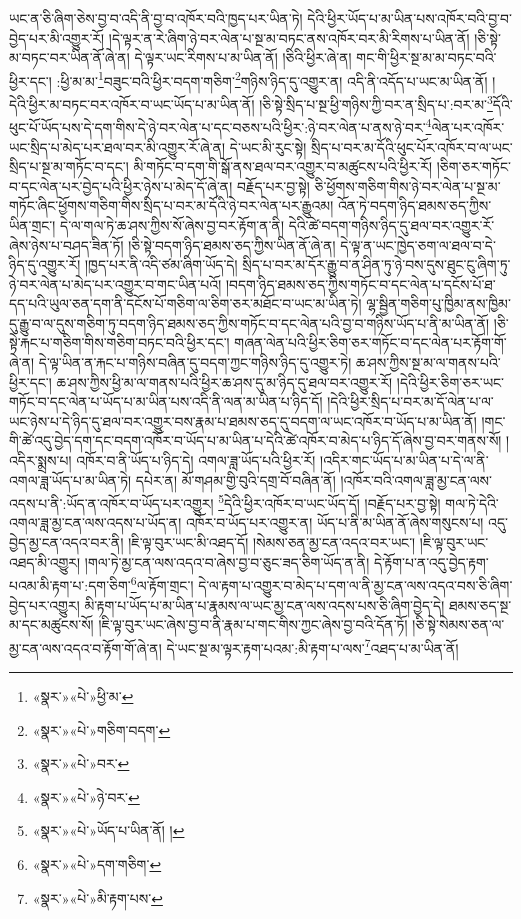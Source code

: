ཡང་ན་ཅི་ཞིག་ཅེས་བྱ་བ་འདི་ནི་བྱ་བ་འཁོར་བའི་ཁྱད་པར་ཡིན་ཏེ། དེའི་ཕྱིར་ཡོད་པ་མ་ཡིན་པས་འཁོར་བའི་བྱ་བ་བྱེད་པར་མི་འགྱུར་རོ། །དེ་ལྟར་ན་རེ་ཞིག་ཉེ་བར་ལེན་པ་སྔ་མ་བཏང་ནས་འཁོར་བར་མི་རིགས་པ་ཡིན་ནོ། །ཅི་སྟེ་མ་བཏང་བར་ཡིན་ནོ་ཞེ་ན། དེ་ལྟར་ཡང་རིགས་པ་མ་ཡིན་ནོ། །ཅིའི་ཕྱིར་ཞེ་ན། གང་གི་ཕྱིར་སྔ་མ་མ་བཏང་བའི་ཕྱིར་དང་། :ཕྱི་མ་མ་\footnote{«སྣར་»«པེ་»ཕྱི་མ་}བཟུང་བའི་ཕྱིར་བདག་གཅིག་\footnote{«སྣར་»«པེ་»གཅིག་བདག་}གཉིས་ཉིད་དུ་འགྱུར་ན། འདི་ནི་འདོད་པ་ཡང་མ་ཡིན་ནོ། །དེའི་ཕྱིར་མ་བཏང་བར་འཁོར་བ་ཡང་ཡོད་པ་མ་ཡིན་ནོ། །ཅི་སྟེ་སྲིད་པ་སྔ་ཕྱི་གཉིས་ཀྱི་བར་ན་སྲིད་པ་:བར་མ་\footnote{«སྣར་»«པེ་»བར་}དོའི་ཕུང་པོ་ཡོད་པས་དེ་དག་གིས་དེ་ཉེ་བར་ལེན་པ་དང་བཅས་པའི་ཕྱིར་:ཉེ་བར་ལེན་པ་ནས་ཉེ་བར་\footnote{«སྣར་»«པེ་»ཉེ་བར་}ལེན་པར་འཁོར་ཡང་སྲིད་པ་མེད་པར་ཐལ་བར་མི་འགྱུར་རོ་ཞེ་ན། དེ་ཡང་མི་རུང་སྟེ། སྲིད་པ་བར་མ་དོའི་ཕུང་པོར་འཁོར་བ་ལ་ཡང་སྲིད་པ་སྔ་མ་གཏོང་བ་དང་། མི་གཏོང་བ་དག་གི་སྒོ་ནས་ཐལ་བར་འགྱུར་བ་མཚུངས་པའི་ཕྱིར་རོ། །ཅིག་ཅར་གཏོང་བ་དང་ལེན་པར་བྱེད་པའི་ཕྱིར་ཉེས་པ་མེད་དོ་ཞེ་ན། བརྗོད་པར་བྱ་སྟེ། ཅི་ཕྱོགས་གཅིག་གིས་ཉེ་བར་ལེན་པ་སྔ་མ་གཏོང་ཞིང་ཕྱོགས་གཅིག་གིས་སྲིད་པ་བར་མ་དོའི་ཉེ་བར་ལེན་པར་རྒྱུའམ། འོན་ཏེ་བདག་ཉིད་ཐམས་ཅད་ཀྱིས་ཡིན་གྲང་། དེ་ལ་གལ་ཏེ་ཆ་ཤས་ཀྱིས་སོ་ཞེས་བྱ་བར་རྟོག་ན་ནི། དེའི་ཚེ་བདག་གཉིས་ཉིད་དུ་ཐལ་བར་འགྱུར་རོ་ཞེས་ཉེས་པ་བཤད་ཟིན་ཏོ། །ཅི་སྟེ་བདག་ཉིད་ཐམས་ཅད་ཀྱིས་ཡིན་ནོ་ཞེ་ན། དེ་ལྟ་ན་ཡང་ཁྱེད་ཅག་ལ་ཐལ་བ་དེ་ཉིད་དུ་འགྱུར་རོ། །ཁྱད་པར་ནི་འདི་ཙམ་ཞིག་ཡོད་དེ། སྲིད་པ་བར་མ་དོར་རྒྱུ་བ་ན་ཤིན་ཏུ་ཉེ་བས་དུས་ཐུང་ངུ་ཞིག་ཏུ་ཉེ་བར་ལེན་པ་མེད་པར་འགྱུར་བ་གང་ཡིན་པའོ། །བདག་ཉིད་ཐམས་ཅད་ཀྱིས་གཏོང་བ་དང་ལེན་པ་དངོས་པོ་ཐ་དད་པའི་ཡུལ་ཅན་དག་ནི་དངོས་པོ་གཅིག་ལ་ཅིག་ཅར་མཐོང་བ་ཡང་མ་ཡིན་ཏེ། ལྷ་སྦྱིན་གཅིག་པུ་ཁྱིམ་ནས་ཁྱིམ་དུ་རྒྱུ་བ་ལ་དུས་གཅིག་ཏུ་བདག་ཉིད་ཐམས་ཅད་ཀྱིས་གཏོང་བ་དང་ལེན་པའི་བྱ་བ་གཉིས་ཡོད་པ་ནི་མ་ཡིན་ནོ། །ཅི་སྟེ་རྐང་པ་གཅིག་གིས་གཅིག་བཏང་བའི་ཕྱིར་དང་། གཞན་ལེན་པའི་ཕྱིར་ཅིག་ཅར་གཏོང་བ་དང་ལེན་པར་རྟོག་གོ་ཞེ་ན། དེ་ལྟ་ཡིན་ན་རྐང་པ་གཉིས་བཞིན་དུ་བདག་ཀྱང་གཉིས་ཉིད་དུ་འགྱུར་ཏེ། ཆ་ཤས་ཀྱིས་སྔ་མ་ལ་གནས་པའི་ཕྱིར་དང་། ཆ་ཤས་ཀྱིས་ཕྱི་མ་ལ་གནས་པའི་ཕྱིར་ཆ་ཤས་དུ་མ་ཉིད་དུ་ཐལ་བར་འགྱུར་རོ། །དེའི་ཕྱིར་ཅིག་ཅར་ཡང་གཏོང་བ་དང་ལེན་པ་ཡོད་པ་མ་ཡིན་པས་འདི་ནི་ལན་མ་ཡིན་པ་ཉིད་དོ། །དེའི་ཕྱིར་སྲིད་པ་བར་མ་དོ་ལེན་པ་ལ་ཡང་ཉེས་པ་དེ་ཉིད་དུ་ཐལ་བར་འགྱུར་བས་རྣམ་པ་ཐམས་ཅད་དུ་བདག་ལ་ཡང་འཁོར་བ་ཡོད་པ་མ་ཡིན་ནོ། །གང་གི་ཚེ་འདུ་བྱེད་དག་དང་བདག་འཁོར་བ་ཡོད་པ་མ་ཡིན་པ་དེའི་ཚེ་འཁོར་བ་མེད་པ་ཉིད་དོ་ཞེས་བྱ་བར་གནས་སོ། །འདིར་སྨྲས་པ། འཁོར་བ་ནི་ཡོད་པ་ཉིད་དེ། འགལ་ཟླ་ཡོད་པའི་ཕྱིར་རོ། །འདིར་གང་ཡོད་པ་མ་ཡིན་པ་དེ་ལ་ནི་འགལ་ཟླ་ཡོད་པ་མ་ཡིན་ཏེ། དཔེར་ན། མོ་གཤམ་གྱི་བུའི་དགྲ་བོ་བཞིན་ནོ། །འཁོར་བའི་འགལ་ཟླ་མྱ་ངན་ལས་འདས་པ་ནི་:ཡོད་ན་འཁོར་བ་ཡོད་པར་འགྱུར། \footnote{«སྣར་»«པེ་»ཡོད་པ་ཡིན་ནོ། ། }དེའི་ཕྱིར་འཁོར་བ་ཡང་ཡོད་དོ། །བརྗོད་པར་བྱ་སྟེ། གལ་ཏེ་དེའི་འགལ་ཟླ་མྱ་ངན་ལས་འདས་པ་ཡོད་ན། འཁོར་བ་ཡོད་པར་འགྱུར་ན། ཡོད་པ་ནི་མ་ཡིན་ནོ་ཞེས་གསུངས་པ། འདུ་བྱེད་མྱ་ངན་འདའ་བར་ནི། །ཇི་ལྟ་བུར་ཡང་མི་འཐད་དོ། །སེམས་ཅན་མྱ་ངན་འདའ་བར་ཡང་། །ཇི་ལྟ་བུར་ཡང་འཐད་མི་འགྱུར། །གལ་ཏེ་མྱ་ངན་ལས་འདའ་བ་ཞེས་བྱ་བ་ཅུང་ཟད་ཅིག་ཡོད་ན་ནི། དེ་རྟོག་པ་ན་འདུ་བྱེད་རྟག་པའམ་མི་རྟག་པ་:དག་ཅིག་\footnote{«སྣར་»«པེ་»དག་གཅིག་}ལ་རྟོག་གྲང་། དེ་ལ་རྟག་པ་འགྱུར་བ་མེད་པ་དག་ལ་ནི་མྱ་ངན་ལས་འདའ་བས་ཅི་ཞིག་བྱེད་པར་འགྱུར། མི་རྟག་པ་ཡོད་པ་མ་ཡིན་པ་རྣམས་ལ་ཡང་མྱ་ངན་ལས་འདས་པས་ཅི་ཞིག་བྱེད་དེ། ཐམས་ཅད་སྔ་མ་དང་མཚུངས་སོ། །ཇི་ལྟ་བུར་ཡང་ཞེས་བྱ་བ་ནི་རྣམ་པ་གང་གིས་ཀྱང་ཞེས་བྱ་བའི་དོན་ཏོ། །ཅི་སྟེ་སེམས་ཅན་ལ་མྱ་ངན་ལས་འདའ་བ་རྟོག་གོ་ཞེ་ན། དེ་ཡང་སྔ་མ་ལྟར་རྟག་པའམ་:མི་རྟག་པ་ལས་\footnote{«སྣར་»«པེ་»མི་རྟག་པས་}འཐད་པ་མ་ཡིན་ནོ། 